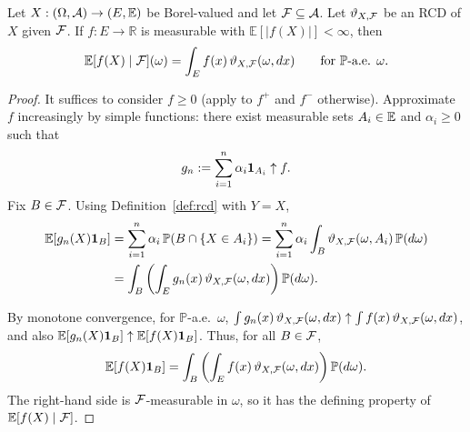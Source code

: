 \begin{theorem}
\label{thm:reg-cond-exp}
Let $X:(\Omega,\mathcal{A})\to(E,\mathbb{E})$ be Borel-valued and let $\mathcal{F}\subseteq\mathcal{A}$.
Let $\vartheta_{X,\mathcal{F}}$ be an RCD of $X$ given $\mathcal{F}$.
If $f:E\to\mathbb{R}$ is measurable with $\mathbb{E}[|f(X)|]<\infty$, then
\begin{equation}
\label{eq:kernel-repr}
\mathbb{E}[f(X)\mid \mathcal{F}](\omega)=\int_E f(x)\,\vartheta_{X,\mathcal{F}}(\omega,dx)
\qquad\text{for }\mathbb{P}\text{-a.e. }\omega.
\end{equation}
\end{theorem}

\begin{proof}
It suffices to consider $f\ge 0$ (apply to $f^+$ and $f^-$ otherwise).
Approximate $f$ increasingly by simple functions:
there exist measurable sets $A_i\in\mathbb{E}$ and $\alpha_i\ge 0$ such that
\[
g_n:=\sum_{i=1}^n \alpha_i \mathbf{1}_{A_i}\uparrow f.
\]
Fix $B\in\mathcal{F}$. Using Definition~\ref{def:rcd} with $Y=X$,
\begin{align*}
\mathbb{E}[g_n(X)\mathbf{1}_B]
&=\sum_{i=1}^n \alpha_i\,\mathbb{P}(B\cap\{X\in A_i\})
=\sum_{i=1}^n \alpha_i \int_B \vartheta_{X,\mathcal{F}}(\omega,A_i)\,\mathbb{P}(d\omega) \\
&=\int_B \left(\int_E g_n(x)\,\vartheta_{X,\mathcal{F}}(\omega,dx)\right)\mathbb{P}(d\omega).    
\end{align*}

By monotone convergence, for $\mathbb{P}$-a.e.\ $\omega$,
$\int g_n(x)\,\vartheta_{X,\mathcal{F}}(\omega,dx)\uparrow \int f(x)\,\vartheta_{X,\mathcal{F}}(\omega,dx)$,
and also $\mathbb{E}[g_n(X)\mathbf{1}_B]\uparrow \mathbb{E}[f(X)\mathbf{1}_B]$.
Thus, for all $B\in\mathcal{F}$,
\[
\mathbb{E}[f(X)\mathbf{1}_B]
=\int_B \left(\int_E f(x)\,\vartheta_{X,\mathcal{F}}(\omega,dx)\right)\mathbb{P}(d\omega).
\]
The right-hand side is $\mathcal{F}$-measurable in $\omega$, so it has the defining property of $\mathbb{E}[f(X)\mid \mathcal{F}]$.
\end{proof}

